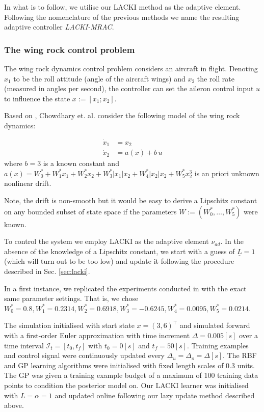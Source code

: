 \documentclass{article} %
\theoremstyle{definition}
\theoremstyle{remark}
\newcommand{\abs}[1]{\left\vert#1\right\vert}
\newcommand{\indsett}{\ensuremath{ {\mathcal I_{t}}}}
\newcommand{\hexp}{{ \alpha }}%
\newcommand{\tinc}{\ensuremath{ \Delta}}
\begin{document}
In what is to follow, we utilise our LACKI method as the adaptive element. Following the nomenclature of the previous methods we name the resulting adaptive controller \textit{LACKI-MRAC}.

\subsubsection{The wing rock control problem}
The wing rock dynamics control problem considers an aircraft in flight. Denoting $x_1$ to be the roll attitude (angle of the aircraft wings) and $x_2$ the roll rate (measured in angles per second), the controller can set the aileron control input $u$ to influence the state $x := [x_1;x_2]$.

Based on \cite{Monahemi1996}, Chowdhary et. al. \cite{Chowdhary2013,ChowdharyCDC2013} consider the following model of the wing rock dynamics: 

\begin{align}
\dot x_1 &= x_2 \\
\dot x_2 &= a(x) + b \, u 
\end{align}
where $b =3$ is a known constant and 
$a(x) = W_0^* + W_1^* x_1 + W_2^* x_2 + W_3^* \abs{x_1} x_2 + W_4^* \abs{x_2} x_2 + W^*_5 x_2^3$ is an priori unknown nonlinear drift. 



Note, the drift is non-smooth but it would be easy to derive a Lipschitz constant on any bounded subset of state space if the parameters $W := (W_0^*,\ldots, W_5^*)$ were known.

To control the system we employ LACKI as the adaptive element $\nu_{ad}$.
In the absence of the knowledge of a Lipschitz constant, we start with a guess of $\underline L=1$ (which will turn out to be too low) and update it following the procedure described in Sec. \ref{sec:lacki}.

In a first instance, we replicated the experiments conducted in \cite{Chowdhary2013,chowdharyacc2013} with the exact same parameter settings. That is, we chose $W_0^* = 0.8, W_1^* = 0.2314, W_2^* = 0.6918, W_3^* = -0.6245, W_4^* = 0.0095, W_5^* = 0.0214$. 



The simulation initialised with start state $x = (3,6)^\top$ and simulated forward with a first-order Euler approximation with time increment $\tinc = 0.005 [s]$ over a time interval $\indsett = [t_0,t_f]$ with $t_0 = 0[s]$ and $t_f = 50[s]$. Training examples and control signal were continuously updated every $\Delta_u= \Delta_o = \tinc [s]$. The RBF and GP learning algorithms were initialised with fixed length scales of 0.3 units. The GP was given a training example budget of a maximum of 100 training data points to condition the posterior model on. Our LACKI learner was initialised with $\underline L =\hexp= 1$ and updated online following our lazy update method described above.
\end{document}
